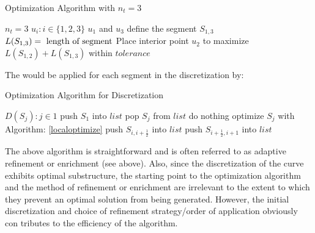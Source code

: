 \begin{algorithm}
\caption{Optimization Algorithm with $n_t=3$}\label{localoptimize}
\begin{algorithmic}[1]
\State $n_t = 3$
\State $u_i : i \in \{1,2,3\}$
\State $u_1 $ and $u_3$ define the segment $S_{1,3}$
  \State $L(S_{1,3}) =\textnormal{ length of segment}$
  \State Place interior point $u_2$ to maximize $L(S_{1,2})+L(S_{1,3})$ within $tolerance$
\EndProcedure
\end{algorithmic}
\end{algorithm}

The would be applied for each segment in the discretization by:

\begin{algorithm}
\caption{Optimization Algorithm for Discretization}
\begin{algorithmic}
  \State $D(S_j) : j \in {1}$
  \State push $S_1$ into $list$ 
    \State pop $S_j$ from $list$
      \State do nothing
    \Else
      \State optimize $S_j$ with Algorithm: \ref{localoptimize}
      \State push $S_{i,i+\frac{1}{2}}$ into $list$
      \State push $S_{i+\frac{1}{2},i+1}$ into $list$
    \EndIf
  \EndWhile
\end{algorithmic}
\end{algorithm}

The above algorithm is straightforward and is often referred to as adaptive refinement or enrichment (see above). Also, since the discretization of the curve exhibits optimal substructure, the starting point to the optimization algorithm and the method of refinement or enrichment are irrelevant to the extent to which they prevent an optimal solution from being generated. However, the initial discretization and choice of refinement strategy/order of application obviously con
tributes to the efficiency of the algorithm.


